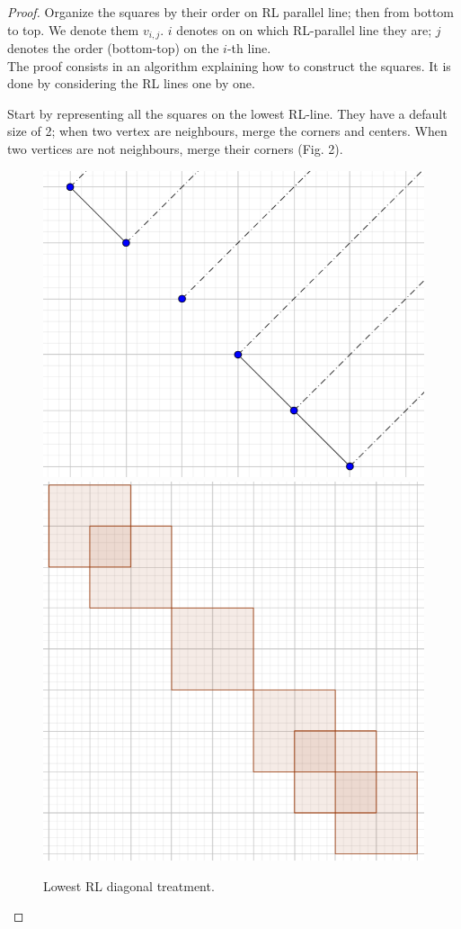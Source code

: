 \documentclass[12pt]{article}
\theoremstyle{definition}
\theoremstyle{remark}
\begin{document}
\begin{proof}
    Organize the squares by their order on RL parallel line; then from bottom to top. We denote them $v_{i,j}$. $i$ denotes on on which RL-parallel line they are;
    $j$ denotes the order (bottom-top) on the $i$-th line. \\
    The proof consists in an algorithm explaining how to construct the squares. It is done by considering the RL lines one by one. 
    
    Start by representing all the squares on the lowest RL-line. They have a default size of 2; when two vertex are neighbours, merge the corners and centers.
    When two vertices are not neighbours, merge their corners (Fig. 2). 
    \begin{figure}[h]
        \centering
        \includegraphics[scale=0.2]{tex_images/on_a_grid_2.png}
        \includegraphics[scale=0.17]{tex_images/on_a_grid_3.png}
        \caption{Lowest RL diagonal treatment.}
    \end{figure}


\end{proof}
\end{document}
